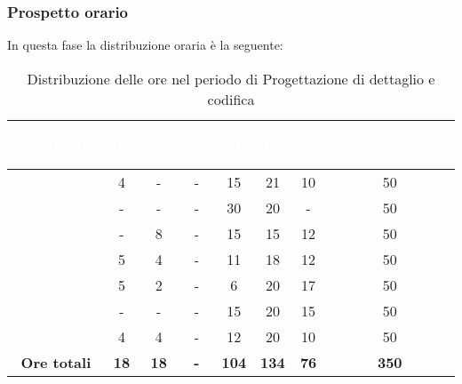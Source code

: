 \subsubsection{Prospetto orario}
In questa fase la distribuzione oraria è la seguente:
\begin{table}[H]
	\begin{center}
		\begin{tabular}{ |c c c c c c c c| }
		\rowcolor{darkblue} 
		\textcolor{white}{\textbf{Nominativo}} & \textcolor{white}{\textbf{Re}} & \textcolor{white}{\textbf{Am}} & \textcolor{white}{\textbf{An}} & \textcolor{white}{\textbf{Pt}} & \textcolor{white}{\textbf{Pr}} & \textcolor{white}{\textbf{Ve}} & \textcolor{white}{\textbf{Ore Complessive}} \\ \hline
		\BL 	& 4  	& -  	& - 	& 15 	& 21 	& 10 	& 50 \\ \hline
		\FF 	& -  	& -  	& - 	& 30 	& 20 	& -  	& 50 \\ \hline
		\MM 	& -  	& 8  	& - 	& 15 	& 15 	& 12 	& 50 \\ \hline
		\PC 	& 5 	& 4  	& - 	& 11 	& 18 	& 12 	& 50 \\ \hline
		\TG 	& 5  	& 2	& - 	& 6 	& 20 	& 17 	& 50 \\ \hline
		\TL 	& -  	& - 	& - 	& 15 	& 20 	& 15 	& 50 \\ \hline
		\VD 	& 4  	& 4  	& - 	& 12 	& 20 	& 10 	& 50 \\ \hline
		\textbf{Ore totali} & \textbf{18} & \textbf{18} & \textbf{-} & \textbf{104} & \textbf{134} & \textbf{76} & \textbf{350} \\ \hline
		\end{tabular}
	\caption{Distribuzione delle ore nel periodo di Progettazione di dettaglio e codifica}
	\end{center}
\end{table}
